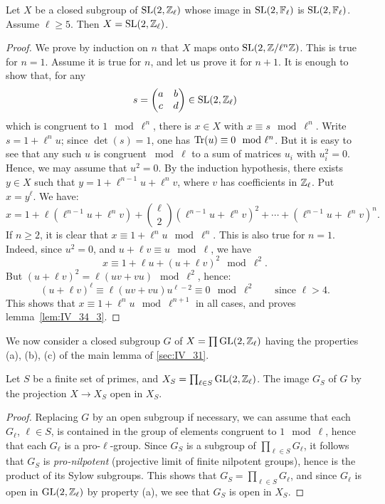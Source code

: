 \begin{lem}\label{lem:IV_34_3}
	Let $X$ be a closed subgroup of $\operatorname{SL}(2, \mathbb{Z}_\ell)$ whose image
	in $\operatorname{SL}(2, \mathbb{F}_\ell)$ is $\operatorname{SL}(2, \mathbb{F}_\ell)$. Assume $\ell \ge 5$. Then $X
	= \operatorname{SL}(2, \mathbb{Z}_\ell)$.
\end{lem}
\begin{proof}
	We prove by induction on $n$ that $X$ maps onto $\operatorname{SL}(2, \mathbb{Z}/\ell^n \mathbb{Z})$.
	This is true for $n = 1$. Assume it is true for $n$, and let us prove it
	for $n+1$. It is enough to show that, for any
	\[
		s = 
		\begin{pmatrix}
			a & b \\
			c & d
		\end{pmatrix}
		\in \operatorname{SL}(2, \mathbb{Z}_\ell)
	\]
	which is congruent to $1 \mod{\ell^n}$, there is $x \in X$ with $x
	\equiv s \mod{\ell^n}$. Write $s = 1 + \ell^nu$; since $\det(s) = 1$,
	one has $\operatorname{Tr}(u) \equiv 0 \mod{\ell^n}$. But it is easy to see that any
	such $u$ is congruent $\bmod{\ell}$ to a sum of matrices $u_i$ with
	$u_i^2 = 0$. Hence, we may assume that $u^2 = 0$. By the induction
	hypothesis, there exists $y \in X$ such that $y = 1 + \ell^{n-1}u +
	\ell^n v$, where $v$ has coefficients in $\mathbb{Z}_\ell$. Put
	\dpage
	$x = y^\ell$. We have:
	\[
		x = 1 + \ell(\ell^{n-1}u + \ell^nv) +
		\binom{\ell}{2}(\ell^{n-1}u + \ell^nv)^2 + \cdots +
		(\ell^{n-1}u + \ell^nv)^n.
	\]
	If $n \ge 2$, it is clear that $x \equiv 1 + \ell^n u \mod{\ell^n}$.
	This is also true for $n = 1$. Indeed, since $u^2 = 0$, and $u + \ell v
	\equiv u \mod\ell$, we have
	\[
		x \equiv 1 + \ell u + (u + \ell v)^2 \mod{\ell^2}.
	\]
	But $(u + \ell v)^2 = \ell(uv + vu) \mod{\ell^2}$, hence:
	\[
		(u + \ell v)^\ell \equiv \ell(uv + vu)u^{\ell-2} \equiv 0
		\mod{\ell^2} \qquad \text{since } \ell > 4.
	\]
	This shows that $x \equiv 1 + \ell^n u \mod{\ell^{n+1}}$ in all cases,
	and proves lemma~\ref{lem:IV_34_3}.
\end{proof}
We now consider a closed subgroup $G$ of $X = \prod \operatorname{GL}(2, \mathbb{Z}_\ell)$ having the
properties (a), (b), (c) of the main lemma of \ref{sec:IV_31}.

\begin{lem}\label{lem:IV_34_4}
	Let $S$ be a finite set of primes, and $X_S = \prod_{\ell\in S} \operatorname{GL}(2,
	\mathbb{Z}_\ell)$.
	The image $G_S$ of $G$ by the projection $X \to X_S$ open in $X_S$.
\end{lem}
\begin{proof}
	Replacing $G$ by an open subgroup if necessary, we can assume that each
	$G_\ell$, $\ell \in S$, is contained in the group of elements congruent
	to $1 \mod{\ell}$, hence that each $G_\ell$ is a pro-$\ell$-group.
	Since $G_S$ is a subgroup of $\prod_{\ell \in S} G_\ell$, it follows
	that $G_S$ is \emph{pro-nilpotent} (projective limit of finite
	nilpotent groups), hence is the product of its Sylow subgroups. This
	shows that $G_S = \prod_{\ell\in S} G_\ell$, and since $G_\ell$ is
	\dpage
	open in $\operatorname{GL}(2, \mathbb{Z}_\ell)$ by property (a), we see that $G_S$ is open in
	$X_S$.
\end{proof}

